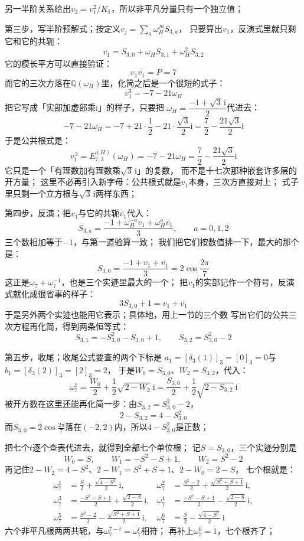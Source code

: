 \documentclass[UTF8,a4paper,11pt]{ctexart}
\newcommand{\ii}{\mathrm{i}}
\newcommand{\QQ}{\mathbb Q}
\begin{document}
另一半阶关系给出$v_2=v_1^{2}/K_1$，所以非平凡分量只有一个独立值；\par

第三步，写半阶预解式；按定义$v_j=\sum_a\omega_H^{ja}S_{3,a}$，
只要算出$v_1$，反演式里就只剩它和它的共轭：
\[
 v_1=S_{3,0}+\omega_H S_{3,1}+\omega_H^2 S_{3,2}
\]
它的模长平方可以直接验证：
\[
 v_1\overline{v_1}=P=7
\]
而它的三次方落在$\QQ(\omega_H)$里，化简之后是一个很短的式子：
\[
 v_1^{3}=-7-21\omega_H
\]
把它写成「实部加虚部乘$\ii$」的样子，只要把
$\omega_H=\dfrac{-1+\sqrt3\,\ii}{2}$代进去：
\[
 -7-21\omega_H=-7+21\cdot\frac12-21\cdot\frac{\sqrt3}{2}\ii
 =\frac72-\frac{21\sqrt3}{2}\ii
\]
于是公共根式是：
\[
 v_1^{\,3}=E^{(H)}_{7,3}(\omega_H)=-7-21\omega_H
 =\frac72-\frac{21\sqrt3}{2}\ii
\]
它只是一个「有理数加有理数乘$\sqrt3\,\ii$」的复数，
而不是十七次那种嵌套许多层的开方量；
这里不必再引入新字母：公共根式就是$v_1$本身，三次方直接对上；
式子里只剩一个立方根与$\sqrt3\,\ii$两样东西；\par

第四步，反演；把$v_1$与它的共轭$\overline{v_1}$代入：
\[
 S_{3,a}=\frac{-1+\omega_H^{-a}v_1+\omega_H^{a}\overline{v_1}}{3},\qquad a=0,1,2
\]
三个数相加等于$-1$，与第一道验算一致；
我们把它们按数值排一下，最大的那个是：
\[
 S_{3,0}=\frac{-1+v_1+\overline{v_1}}{3}=2\cos\frac{2\pi}{7}
\]
这正是$\omega_7+\omega_7^{-1}$，也是三个实迹里最大的一个；
把$v_1$的实部记作一个符号，反演式就化成很省事的样子：
\[
 3S_{3,0}+1=v_1+\overline{v_1}
\]
于是另外两个实迹也能用它表示；具体地，用上一节的三个数
写出它们的公共三次方程再化简，得到两条恒等式：
\[
 S_{3,1}=-S_{3,0}^2-S_{3,0}+1,\qquad S_{3,2}=S_{3,0}^2-2
\]

第五步，收尾；收尾公式要查的两个下标是
$a_1=[\delta_3(1)]_3=[0]_3=0$与$b_1=[\delta_3(2)]_3=[2]_3=2$，
于是$W_0=S_{3,0}$、$W_2=S_{3,2}$，代入：
\[
 \omega_7^1=\frac{W_0}{2}+\frac12\sqrt{2-W_2}\ \ii
 =\frac{S_{3,0}}{2}+\frac12\sqrt{2-S_{3,2}}\ \ii
\]
被开方数在这里还能再化简一步：由$S_{3,2}=S_{3,0}^2-2$，
\[
 2-S_{3,2}=4-S_{3,0}^2
\]
而$S_{3,0}=2\cos\frac{2\pi}{7}$落在$(-2,2)$内，所以$4-S_{3,0}^2$是正数；\par

把七个$t$逐个查表代进去，就得到全部七个单位根；
记$S=S_{3,0}$，三个实迹分别是
\[
 W_0=S,\qquad W_1=-S^2-S+1,\qquad W_2=S^2-2
\]
再记住$2-W_2=4-S^2$、$2-W_1=S^2+S+1$、$2-W_0=2-S$，
七个根就是：
\[
 \begin{aligned}
 \omega_7^{1}&=\frac{S}{2}+\frac{\sqrt{4-S^2}}{2}\,\ii,
 &\omega_7^{2}&=\frac{S^2-2}{2}+\frac{\sqrt{S^2+S+1}}{2}\,\ii,\\[4pt]
 \omega_7^{3}&=\frac{-S^2-S+1}{2}+\frac{\sqrt{2-S}}{2}\,\ii,
 &\omega_7^{4}&=\frac{-S^2-S+1}{2}-\frac{\sqrt{2-S}}{2}\,\ii,\\[4pt]
 \omega_7^{5}&=\frac{S^2-2}{2}-\frac{\sqrt{S^2+S+1}}{2}\,\ii,
 &\omega_7^{6}&=\frac{S}{2}-\frac{\sqrt{4-S^2}}{2}\,\ii
 \end{aligned}
\]
六个非平凡根两两共轭，与$\omega_7^{7-t}=\overline{\omega_7^{t}}$相符；
再补上$\omega_7^0=1$，七个根齐了；\par
\end{document}
